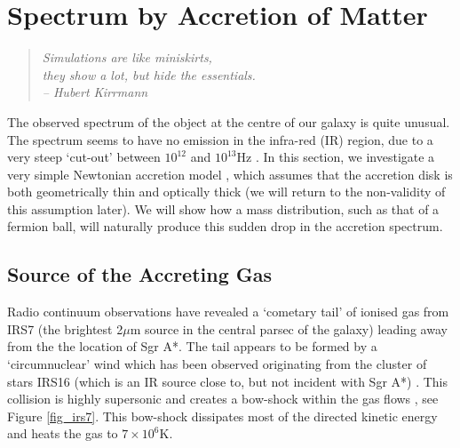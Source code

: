 \section{Spectrum by Accretion of Matter}
\label{sec_accretion}
\begin{quotation}
	\raggedleft \it
	Simulations are like miniskirts,\\
	they show a lot, but hide the essentials.\\
	-- Hubert Kirrmann
\end{quotation}
The observed spectrum of the object at the centre of our galaxy is quite unusual. The spectrum seems to have no emission in the infra-red (IR)
region, due to a very steep `cut-out' between $10^{12}$ and $10^{13}$Hz \cite{ref_meliareview}.
In this section, we investigate a very simple Newtonian accretion model \cite{ref_FKR},
which assumes that the accretion disk is both geometrically thin and optically thick (we will return to the non-validity of this assumption
later). We will show how a mass distribution, such as that of a fermion ball, will naturally produce this sudden drop in the accretion
spectrum.

\subsection{Source of the Accreting Gas}
Radio continuum observations have revealed a `cometary tail' of ionised gas from IRS7 (the brightest 2$\mu$m source in the central
parsec of the galaxy) leading away from the the location of Sgr A*. The tail appears to be formed by a `circumnuclear' wind which has been
observed originating from the cluster of stars IRS16 (which is an IR source close to, but not incident with Sgr A*) \cite{ref_yusefmorris}.
This collision is highly supersonic and creates a bow-shock within the gas flows \cite{ref_melia}, see Figure \ref{fig_irs7}.
This bow-shock dissipates most of the directed kinetic energy and heats the gas to $7 \times 10^6$K.

